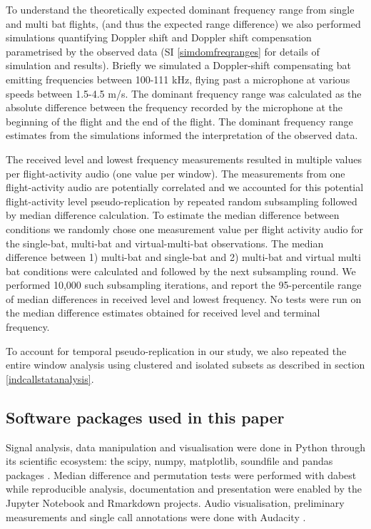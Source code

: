 \documentclass[
]{book}
\begin{document}
To understand the theoretically expected dominant frequency range from single and multi bat flights, (and thus the expected range difference) we also performed simulations quantifying Doppler shift and Doppler shift compensation parametrised by the observed data (SI \ref{simdomfreqranges} for details of simulation and results). Briefly we simulated a Doppler-shift compensating bat emitting frequencies between 100-111 kHz, flying past a microphone at various speeds between 1.5-4.5 m/s. The dominant frequency range was calculated as the absolute difference between the frequency recorded by the microphone at the beginning of the flight and the end of the flight. The dominant frequency range estimates from the simulations informed the interpretation of the observed data.

The received level and lowest frequency measurements resulted in multiple values per flight-activity audio (one value per window). The measurements from one flight-activity audio are potentially correlated and we accounted for this potential flight-activity level pseudo-replication by repeated random subsampling followed by median difference calculation. To estimate the median difference between conditions we randomly chose one measurement value per flight activity audio for the single-bat, multi-bat and virtual-multi-bat observations. The median difference between 1) multi-bat and single-bat and 2) multi-bat and virtual multi bat conditions were calculated and followed by the next subsampling round. We performed 10,000 such subsampling iterations, and report the 95-percentile range of median differences in received level and lowest frequency. No tests were run on the median difference estimates obtained for received level and terminal frequency.

To account for temporal pseudo-replication in our study, we also repeated the entire window analysis using clustered and isolated subsets as described in section \ref{indcallstatanalysis}.

\hypertarget{software-packages-used-in-this-paper}{%
\subsection{Software packages used in this paper}\label{software-packages-used-in-this-paper}}

Signal analysis, data manipulation and visualisation were done in Python \citep{van1995python} through its scientific ecosystem: the scipy, numpy, matplotlib, soundfile and pandas packages \citep{2020SciPy, numpy, matplotlib, soundfile, pandas}. Median difference and permutation tests were performed with dabest \citep{ho2019moving} while reproducible analysis, documentation and presentation were enabled by the Jupyter Notebook and Rmarkdown projects\citep{jupyter, rmarkdown}. Audio visualisation, preliminary measurements and single call annotations were done with Audacity \citep{audacity}.
\end{document}

